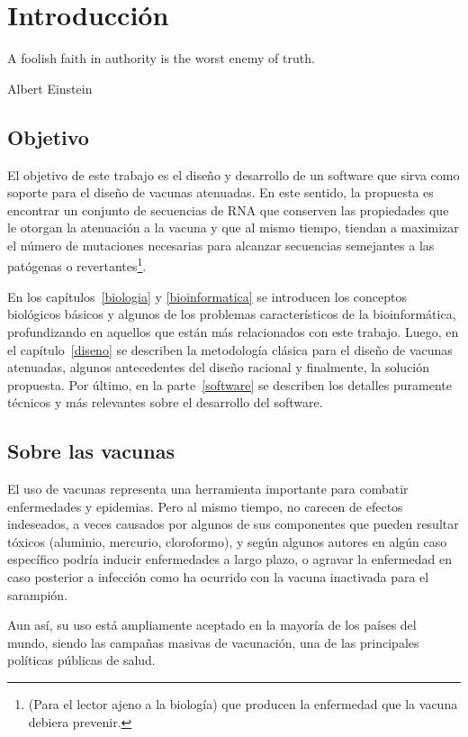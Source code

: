\chapter{Introducci\'on}
\epigraph{A foolish faith in authority is the worst enemy of truth.}%
         {Albert Einstein}

\section{Objetivo}
El objetivo de este trabajo es el dise\~no y desarrollo de un software que
sirva como soporte para el dise\~no de vacunas atenuadas. En este sentido, la
propuesta es encontrar un conjunto de secuencias de \ac{RNA} que conserven las
propiedades que le otorgan la atenuaci\'on a la vacuna y que al mismo tiempo,
tiendan a maximizar el n\'umero de mutaciones necesarias para alcanzar
secuencias semejantes a las pat\'ogenas o revertantes\footnote{(Para el lector
ajeno a la biolog\'ia) que producen la enfermedad que la vacuna debiera
prevenir.}. 

En los cap\'itulos~\ref{biologia} y \ref{bioinformatica} se introducen los
conceptos biol\'ogicos b\'asicos y algunos de los problemas caracter\'isticos
de la bioinform\'atica, profundizando en aquellos que est\'an m\'as relacionados
con este trabajo. Luego, en el cap\'itulo~\ref{diseno} se describen la
metodolog\'ia cl\'asica para el dise\~no de vacunas atenuadas, algunos
antecedentes del dise\~no racional y finalmente, la soluci\'on propuesta. Por
\'ultimo, en la parte~\ref{software} se describen los detalles puramente
t\'ecnicos y m\'as relevantes sobre el desarrollo del software.

\section{Sobre las vacunas}
\label{vacunas}
El uso de vacunas representa una herramienta importante para combatir enfermedades y
epidemias. Pero al mismo tiempo, no carecen de efectos indeseados, a veces causados
por algunos de sus componentes que pueden resultar t\'oxicos (aluminio, mercurio,
cloroformo), y seg\'un algunos autores en alg\'un caso espec\'ifico podr\'ia inducir
enfermedades a largo plazo, o agravar la enfermedad en caso posterior a infecci\'on
como ha ocurrido con la vacuna inactivada para el sarampi\'on.

Aun as\'i, su uso est\'a ampliamente aceptado en la mayor\'ia de los pa\'ises
del mundo, siendo las campa\~nas masivas de vacunaci\'on, una de las
principales pol\'iticas p\'ublicas de salud.

